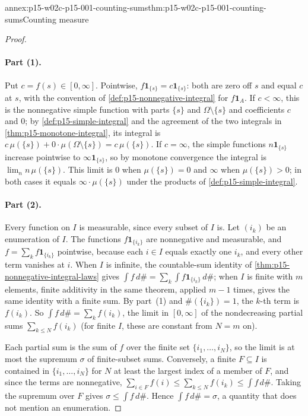 \begin{annexitem}{annex:p15-w02c-p15-001-counting-sums}{thm:p15-w02c-p15-001-counting-sums}{Counting measure}
\begin{proof}
\paragraph{Part (1).}
Put \(c=f(s)\in[0,\infty]\). Pointwise, \(f\mathbf1_{\{s\}}=c\mathbf1_{\{s\}}\):
both are zero off \(s\) and equal \(c\) at \(s\), with the convention
of \cref{def:p15-nonnegative-integral} for \(f\mathbf1_A\). If
\(c<\infty\), this is the nonnegative simple function with parts
\(\{s\}\) and \(\Omega\setminus\{s\}\) and coefficients \(c\) and \(0\);
by \cref{def:p15-simple-integral} and the agreement of the two integrals
in \cref{thm:p15-monotone-integral}, its integral is
\(c\,\mu(\{s\})+0\cdot\mu(\Omega\setminus\{s\})=c\,\mu(\{s\})\). If
\(c=\infty\), the simple functions \(n\mathbf1_{\{s\}}\) increase
pointwise to \(\infty\mathbf1_{\{s\}}\), so by monotone convergence the
integral is \(\lim_nn\,\mu(\{s\})\). This limit is \(0\) when
\(\mu(\{s\})=0\) and \(\infty\) when \(\mu(\{s\})>0\); in both cases it
equals \(\infty\cdot\mu(\{s\})\) under the products of
\cref{def:p15-simple-integral}.

\paragraph{Part (2).}
Every function on \(I\) is measurable, since every subset of \(I\) is.
Let \((i_k)\) be an enumeration of \(I\). The functions
\(f\mathbf1_{\{i_k\}}\) are nonnegative and measurable, and
\(f=\sum_kf\mathbf1_{\{i_k\}}\) pointwise, because each \(i\in I\) equals
exactly one \(i_k\), and every other term vanishes at \(i\). When \(I\) is
infinite, the countable-sum identity of
\cref{thm:p15-nonnegative-integral-laws} gives
\(\int f\,d\#=\sum_k\int f\mathbf1_{\{i_k\}}\,d\#\); when \(I\) is finite
with \(m\) elements, finite additivity in the same theorem, applied
\(m-1\) times, gives the same identity with a finite sum. By part~(1)
and \(\#(\{i_k\})=1\), the \(k\)-th term is \(f(i_k)\). So
\(\int f\,d\#=\sum_kf(i_k)\), the limit in \([0,\infty]\) of the
nondecreasing partial sums \(\sum_{k\leq N}f(i_k)\) (for finite \(I\),
these are constant from \(N=m\) on).

Each partial sum is the sum of \(f\) over the finite set
\(\{i_1,\ldots,i_N\}\), so the limit is at most the supremum \(\sigma\) of
finite-subset sums. Conversely, a finite \(F\subseteq I\) is contained in
\(\{i_1,\ldots,i_N\}\) for \(N\) at least the largest index of a member of
\(F\), and since the terms are nonnegative,
\(\sum_{i\in F}f(i)\leq\sum_{k\leq N}f(i_k)\leq\int f\,d\#\). Taking the
supremum over \(F\) gives \(\sigma\leq\int f\,d\#\). Hence
\(\int f\,d\#=\sigma\), a quantity that does not mention an
enumeration.


\end{proof}
\end{annexitem}
